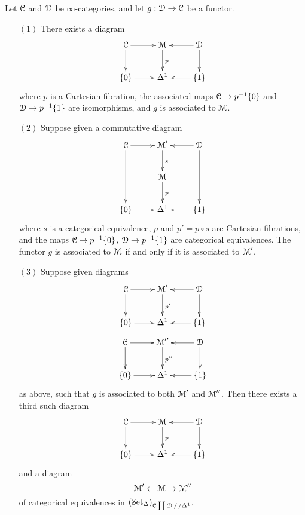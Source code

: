 \begin{proposition}\label{candi}
Let $\operatorname{\mathcal{C}}$ and $\operatorname{\mathcal{D}}$ be $\infty$-categories, and let $g: \operatorname{\mathcal{D}} \rightarrow \operatorname{\mathcal{C}}$
be a functor. 
\begin{itemize}
\item[$(1)$] There exists a diagram
$$ \xymatrix{ \calC \ar[r] \ar[d] & \calM \ar[d]^{p} & \calD \ar[l] \ar[d] \\
\{0\} \ar[r] & \Delta^1 & \{1\} \ar[l] }$$
where $p$ is a Cartesian fibration, the associated maps $\operatorname{\mathcal{C}} \rightarrow p^{-1} \{0\}$ and $\operatorname{\mathcal{D}} \rightarrow p^{-1} \{1\}$ are isomorphisms, and $g$ is associated to $\operatorname{\mathcal{M}}$.

\item[$(2)$] Suppose given a commutative diagram
$$ \xymatrix{ \calC \ar[r] \ar[dd] & \calM' \ar[d]^{s} & \calD \ar[l] \ar[dd] \\
& \calM \ar[d]^{p} & \\
\{0\} \ar[r] & \Delta^1 & \{1\} \ar[l] }$$ 
where $s$ is a categorical equivalence, $p$ and $p' = p \circ s$ are Cartesian fibrations,
and the maps $\operatorname{\mathcal{C}} \rightarrow p^{-1} \{0\}$, $\operatorname{\mathcal{D}} \rightarrow p^{-1} \{1\}$ are categorical equivalences. The functor $g$ is associated to $\operatorname{\mathcal{M}}$ if and only if it is associated to $\operatorname{\mathcal{M}}'$.

\item[$(3)$] Suppose given diagrams 
$$ \xymatrix{ \calC \ar[r] \ar[d] & \calM' \ar[d]^{p'} & \calD \ar[l] \ar[d] \\
\{0\} \ar[r] & \Delta^1 & \{1\} \ar[l] }$$
$$ \xymatrix{ \calC \ar[r] \ar[d] & \calM'' \ar[d]^{p''} & \calD \ar[l] \ar[d] \\
\{0\} \ar[r] & \Delta^1 & \{1\} \ar[l] }$$
as above, such that $g$ is associated to both $\operatorname{\mathcal{M}}'$ and $\operatorname{\mathcal{M}}''$. Then there
exists a third such diagram
$$ \xymatrix{ \calC \ar[r] \ar[d] & \calM \ar[d]^{p} & \calD \ar[l] \ar[d] \\
\{0\} \ar[r] & \Delta^1 & \{1\} \ar[l] }$$
and a diagram 
$$ \operatorname{\mathcal{M}}' \leftarrow \operatorname{\mathcal{M}} \rightarrow \operatorname{\mathcal{M}}''$$
of categorical equivalences in $(\operatorname{\mathcal{S}et_{\Delta}})_{\operatorname{\mathcal{C}} \coprod \operatorname{\mathcal{D}}/ \,/\Delta^1}$.
\end{itemize}
\end{proposition}


